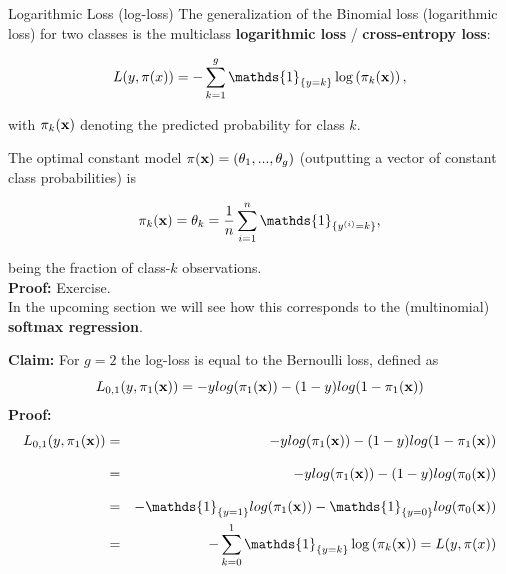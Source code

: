 \documentclass[11pt,compress,t,notes=noshow, xcolor=table]{beamer}
\begin{document}
\begin{vbframe}{Logarithmic Loss (log-loss)}
The generalization of the Binomial loss (logarithmic loss) for two classes is the multiclass \textbf{logarithmic loss} / \textbf{cross-entropy loss}:

\vspace*{-0.2cm}
\begin{footnotesize}
$$
  L(y, \pi(x)) = - \sum_{k = 1}^g \mathds{1}_{\{y = k\}} \log\left(\pi_k(\xv)\right),
$$
\end{footnotesize}
with $\pi_k(\mathbf{x})$ denoting the predicted probability for class $k$.

\vspace*{0.2cm}
 
The optimal constant model $\pi(\mathbf{x}) = \left(\theta_1, ..., \theta_g\right)$ (outputting a vector of constant class probabilities) is
\begin{footnotesize}
$$
    \pikx = \theta_k = \frac{1}{n} \sumin \mathds{1}_{\{\yi = k\}},   
$$
\end{footnotesize}
 being the fraction of class-$k$ observations. \\
\vspace*{0.5cm}
\textbf{Proof:} Exercise. \\
\vspace*{0.5cm}
In the upcoming section we will see how this corresponds to the (multinomial) \textbf{softmax regression}. 

\framebreak
\textbf{Claim:} For $g = 2$ the log-loss is equal to the Bernoulli loss, defined as
$$L_{0, 1}(y, \pi_1(\mathbf{x})) = -ylog(\pi_1(\mathbf{x})) - (1- y) log(1- \pi_1(\mathbf{x}))$$
\textbf{Proof:}
\begin{eqnarray*}
L_{0, 1}(y, \pi_1(\xv)) &=& -ylog(\pi_1(\xv)) - (1- y) log(1- \pi_1(\xv))\\[0.3cm]
&=& -ylog(\pi_1(\xv)) - (1- y) log(\pi_0(\xv))\\[0.3cm]
&=& -\mathds{1}_{\{y = 1\}} log(\pi_1(\xv)) - \mathds{1}_{\{y = 0\}} log(\pi_0(\xv))\\
&=& - \sum_{k = 0}^1 \mathds{1}_{\{y = k\}} \log\left(\pi_k(\xv)\right) = L(y, \pi(x))
\end{eqnarray*}
\end{vbframe}

\endlecture
\end{document}
